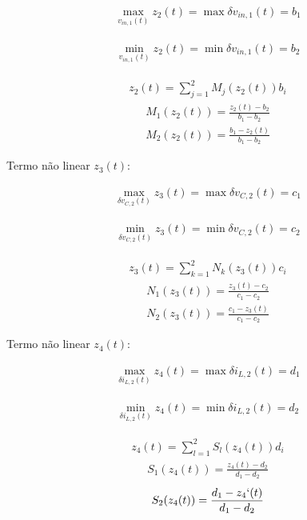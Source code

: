 \begin{gather*}
    \max_{ v_{in,1}(t)} z_2(t) = \max \delta v_{in,1}(t) = b_1
\end{gather*}

\begin{gather}
    \min_{ v_{in,1}(t)} z_2(t) = \min \delta v_{in,1}(t) = b_2
\end{gather}

\begin{gather*}
    z_2(t) = \sum\limits_{j=1}^{2} M_j(z_2(t))b_i
\end{gather*}
\begin{gather}
    M_1(z_2(t)) = \frac{z_2(t) - b_2}{b_1 - b_2}
\end{gather}
\begin{gather}
    M_2(z_2(t)) = \frac{b_1 - z_2(t)}{b_1 - b_2}
\end{gather}

Termo não linear $z_3(t)$:

\begin{gather*}
    \max_{\delta v_{C,2}(t)} z_3(t) = \max \delta v_{C,2}(t) = c_1
\end{gather*}

\begin{gather}
    \min_{\delta v_{C,2}(t)} z_3(t) = \min \delta v_{C,2}(t) = c_2
\end{gather}

\begin{gather*}
    z_3(t) = \sum\limits_{k=1}^{2} N_k(z_3(t))c_i
\end{gather*}
\begin{gather}
    N_1(z_3(t)) = \frac{z_3(t) - c_2}{c_1 - c_2}
\end{gather}
\begin{gather}
    N_2(z_3(t)) = \frac{c_1 - z_3(t)}{c_1 - c_2}
\end{gather}

Termo não linear $z_4(t)$:

\begin{gather*}
    \max_{\delta i_{L,2}(t)} z_4(t) = \max \delta i_{L,2}(t) = d_1
\end{gather*}

\begin{gather}
    \min_{\delta i_{L,2}(t)} z_4(t) = \min \delta i_{L,2}(t) = d_2
\end{gather}

\begin{gather*}
    z_4(t) = \sum\limits_{l=1}^{2} S_l(z_4(t))d_i
\end{gather*}
\begin{gather}
    S_1(z_4(t)) = \frac{z_4(t) - d_2}{d_1 - d_2}
\end{gather}
\begin{gather}
    S_2(z_4(t)) = \frac{d_1 - z_4`(t)}{d_1 - d_2}
\end{gather}

